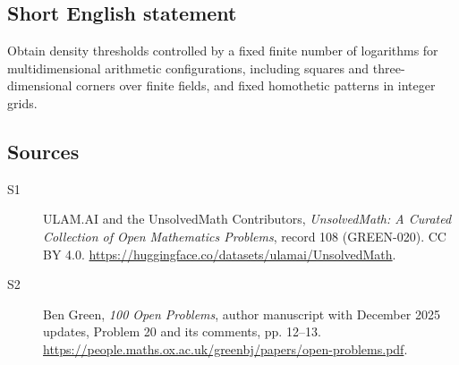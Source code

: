 \documentclass[11pt]{article}
\begin{document}
\subsection{Short English statement}
Obtain density thresholds controlled by a fixed finite number of logarithms for multidimensional arithmetic configurations, including squares and three-dimensional corners over finite fields, and fixed homothetic patterns in integer grids.
\subsection{Sources}
\begin{description}
\item[\hypertarget{source:108:1}{S1}] ULAM.AI and the UnsolvedMath Contributors, \emph{UnsolvedMath: A Curated Collection of Open Mathematics Problems}, record 108 (GREEN-020). CC BY 4.0. \url{https://huggingface.co/datasets/ulamai/UnsolvedMath}.
\item[\hypertarget{source:108:2}{S2}] Ben Green, \emph{100 Open Problems}, author manuscript with December 2025 updates, Problem 20 and its comments, pp. 12--13. \url{https://people.maths.ox.ac.uk/greenbj/papers/open-problems.pdf}.
\end{description}
\label{end:108}
\end{document}
